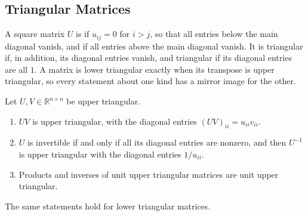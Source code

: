 \subsection{Triangular Matrices}

A square matrix $U$ is  if $u_{ij}=0$ for $i>j$, so that all entries below the main diagonal vanish, and  if all entries above the main diagonal vanish. It is  triangular if, in addition, its diagonal entries vanish, and  triangular if its diagonal entries are all $1$. A matrix is lower triangular exactly when its transpose is upper triangular, so every statement about one kind has a mirror image for the other.

\begin{theorem}
\label{thm:triangular}
Let $U,V\in\mathbb R^{n\times n}$ be upper triangular.
\begin{enumerate}
\item $UV$ is upper triangular, with the diagonal entries $(UV)_{ii}=u_{ii}v_{ii}$.
\item $U$ is invertible if and only if all its diagonal entries are nonzero, and then $U^{-1}$ is upper triangular with the diagonal entries $1/u_{ii}$.
\item Products and inverses of unit upper triangular matrices are unit upper triangular.
\end{enumerate}
The same statements hold for lower triangular matrices.
\end{theorem}

